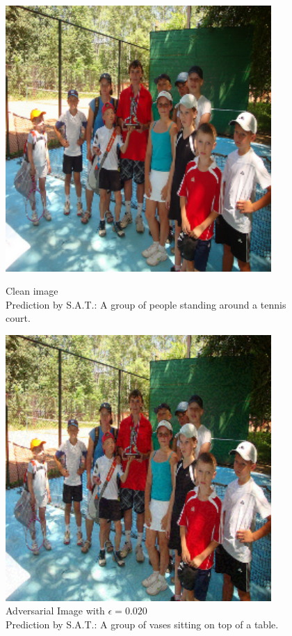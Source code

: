 \begin{figure}[ht]
    \centering
    \begin{minipage}{0.45\textwidth}
        \centering
        \includegraphics[width=0.9\textwidth]{figures/group_of_people/group_of_people_0.000.png} %
        \caption*{Clean image\\Prediction by S.A.T.: A group of people standing around a tennis court.}
    \end{minipage}\hfill
    \begin{minipage}{0.45\textwidth}
        \centering
        \includegraphics[width=0.9\textwidth]{figures/group_of_people/group_of_people_0.020.png} %
        \caption*{Adversarial Image with $\epsilon=0.020$\\Prediction by S.A.T.: A group of vases sitting on top of a table.}
    \end{minipage}
\end{figure}

